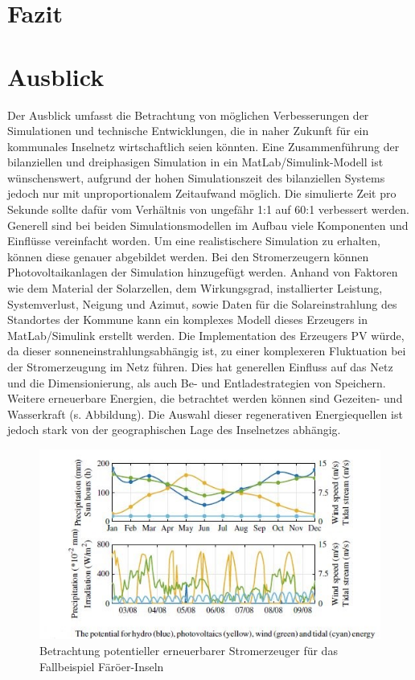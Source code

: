 \chapter{Fazit}

\chapter{Ausblick}

Der Ausblick umfasst die Betrachtung von möglichen Verbesserungen der Simulationen und technische Entwicklungen, die in naher Zukunft für ein kommunales Inselnetz wirtschaftlich seien könnten.
Eine Zusammenführung der bilanziellen und dreiphasigen Simulation in ein MatLab/Simulink-Modell ist wünschenswert, aufgrund der hohen Simulationszeit des bilanziellen Systems jedoch nur mit unproportionalem Zeitaufwand möglich.
Die simulierte Zeit pro Sekunde sollte dafür vom Verhältnis von ungefähr 1:1 auf 60:1 verbessert werden.
Generell sind bei beiden Simulationsmodellen im Aufbau viele Komponenten und Einflüsse vereinfacht worden. 
Um eine realistischere Simulation zu erhalten, können diese genauer abgebildet werden.
Bei den Stromerzeugern können Photovoltaikanlagen der Simulation hinzugefügt werden.
Anhand von Faktoren wie dem Material der Solarzellen, dem Wirkungsgrad, installierter Leistung, Systemverlust, Neigung und Azimut, sowie Daten für die Solareinstrahlung des Standortes der Kommune kann ein komplexes Modell dieses Erzeugers in MatLab/Simulink erstellt werden\cite{jrcpv}.
Die Implementation des Erzeugers PV würde, da dieser sonneneinstrahlungsabhängig ist, zu einer komplexeren Fluktuation bei der Stromerzeugung im Netz führen. 
Dies hat generellen Einfluss auf das Netz und die Dimensionierung, als auch Be- und Entladestrategien von Speichern.
Weitere erneuerbare Energien, die betrachtet werden können sind Gezeiten- und Wasserkraft (s. Abbildung).
Die Auswahl dieser regenerativen Energiequellen ist jedoch stark von der geographischen Lage des Inselnetzes abhängig.
  
\begin{figure}[h!]
    \centering
    \includegraphics[width=14cm]{Abbildungen/AusblickAbb1.jpg}
    \caption{Betrachtung potentieller erneuerbarer Stromerzeuger für das Fallbeispiel Färöer-Inseln\cite{faroer}}\label{fig:Stromerzeuger_Faroer}
\end{figure}


